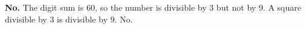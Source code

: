 \textbf{No.} The digit sum is $60$, so the number is divisible by $3$ but not by $9$. A square divisible by $3$ is divisible by $9$. $\boxed{\text{No}}$.
